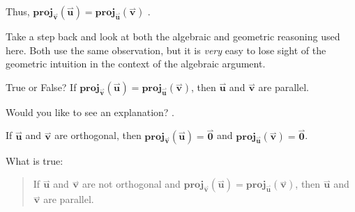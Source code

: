 \documentclass{ximera}
\begin{document}
\begin{exercise}
\begin{selectAll}
\begin{hint}
\begin{problem}
\begin{question}
\begin{itemize}
Thus,  $\mathbf{proj}_{\overset{\boldsymbol{\rightharpoonup}}{\mathbf{v}}}(\overset{\boldsymbol{\rightharpoonup}}{\mathbf{u}}) = \mathbf{proj}_{\overset{\boldsymbol{\rightharpoonup}}{\mathbf{u}}}(\overset{\boldsymbol{\rightharpoonup}}{\mathbf{v}})$  .

\end{itemize}

Take a step back and look at both the algebraic and geometric reasoning used here.  Both use the same observation, but it is \emph{very} easy to lose sight of the geometric intuition in the context of the algebraic argument.
\end{question}
\end{problem}




\begin{problem}
True or False?  If $\mathbf{proj}_{\overset{\boldsymbol{\rightharpoonup}}{\mathbf{v}}}(\overset{\boldsymbol{\rightharpoonup}}{\mathbf{u}}) = \mathbf{proj}_{\overset{\boldsymbol{\rightharpoonup}}{\mathbf{u}}}(\overset{\boldsymbol{\rightharpoonup}}{\mathbf{v}})$, then $\overset{\boldsymbol{\rightharpoonup}}{\mathbf{u}}$ and $\overset{\boldsymbol{\rightharpoonup}}{\mathbf{v}}$ are parallel.

Would you like to see an explanation?
.

\begin{question}
If $\overset{\boldsymbol{\rightharpoonup}}{\mathbf{u}}$ and $\overset{\boldsymbol{\rightharpoonup}}{\mathbf{v}}$ are orthogonal, then $\mathbf{proj}_{\overset{\boldsymbol{\rightharpoonup}}{\mathbf{v}}}(\overset{\boldsymbol{\rightharpoonup}}{\mathbf{u}}) = \overset{\boldsymbol{\rightharpoonup}}{\mathbf{0}}$ and $\mathbf{proj}_{\overset{\boldsymbol{\rightharpoonup}}{\mathbf{u}}}(\overset{\boldsymbol{\rightharpoonup}}{\mathbf{v}}) = \overset{\boldsymbol{\rightharpoonup}}{\mathbf{0}}$.  

What is true:

\begin{quote}
If $\overset{\boldsymbol{\rightharpoonup}}{\mathbf{u}}$ and $\overset{\boldsymbol{\rightharpoonup}}{\mathbf{v}}$ are not orthogonal and $\mathbf{proj}_{\overset{\boldsymbol{\rightharpoonup}}{\mathbf{v}}}(\overset{\boldsymbol{\rightharpoonup}}{\mathbf{u}}) = \mathbf{proj}_{\overset{\boldsymbol{\rightharpoonup}}{\mathbf{u}}}(\overset{\boldsymbol{\rightharpoonup}}{\mathbf{v}})$, then $\overset{\boldsymbol{\rightharpoonup}}{\mathbf{u}}$ and $\overset{\boldsymbol{\rightharpoonup}}{\mathbf{v}}$ are parallel.
\end{quote}


\end{question}
\end{problem}
\end{hint}
\end{selectAll}
\end{exercise}
\end{document}
